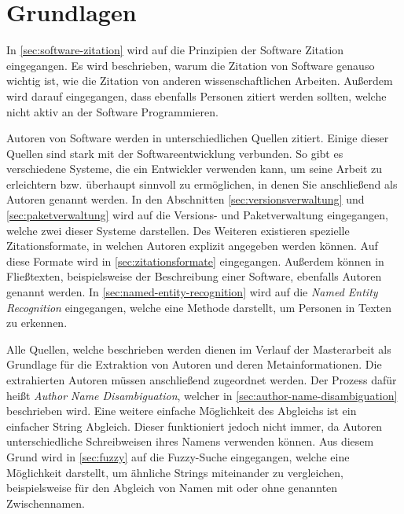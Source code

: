 \chapter{Grundlagen}
\label{chap:grundlagen}
In \autoref{sec:software-zitation} wird auf die Prinzipien der Software Zitation eingegangen.
Es wird beschrieben, warum die Zitation von Software genauso wichtig ist, wie die Zitation von anderen wissenschaftlichen Arbeiten.
Außerdem wird darauf eingegangen, dass ebenfalls Personen zitiert werden sollten, welche nicht aktiv an der Software Programmieren.

Autoren von Software werden in unterschiedlichen Quellen zitiert.
Einige dieser Quellen sind stark mit der Softwareentwicklung verbunden.
So gibt es verschiedene Systeme, die ein Entwickler verwenden kann, um seine Arbeit zu erleichtern bzw. überhaupt sinnvoll zu ermöglichen, in denen Sie anschließend als Autoren genannt werden.
In den Abschnitten \ref{sec:versionsverwaltung} und \ref{sec:paketverwaltung} wird auf die Versions- und Paketverwaltung eingegangen, welche zwei dieser Systeme darstellen.
Des Weiteren existieren spezielle Zitationsformate, in welchen Autoren explizit angegeben werden können.
Auf diese Formate wird in \autoref{sec:zitationsformate} eingegangen.
Außerdem können in Fließtexten, beispielsweise der Beschreibung einer Software, ebenfalls Autoren genannt werden.
In \autoref{sec:named-entity-recognition} wird auf die \emph{Named Entity Recognition} eingegangen, welche eine Methode darstellt, um Personen in Texten zu erkennen.

Alle Quellen, welche beschrieben werden dienen im Verlauf der Masterarbeit als Grundlage für die Extraktion von Autoren und deren Metainformationen.
Die extrahierten Autoren müssen anschließend zugeordnet werden.
Der Prozess dafür heißt \emph{Author Name Disambiguation}, welcher in \autoref{sec:author-name-disambiguation} beschrieben wird.
Eine weitere einfache Möglichkeit des Abgleichs ist ein einfacher String Abgleich.
Dieser funktioniert jedoch nicht immer, da Autoren unterschiedliche Schreibweisen ihres Namens verwenden können.
Aus diesem Grund wird in \autoref{sec:fuzzy} auf die Fuzzy-Suche eingegangen, welche eine Möglichkeit darstellt, um ähnliche Strings miteinander zu vergleichen, beispielsweise für den Abgleich von Namen mit oder ohne genannten Zwischennamen.







